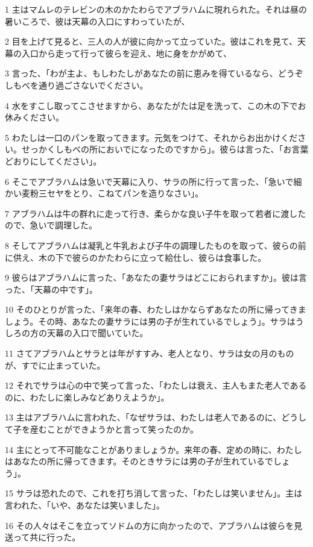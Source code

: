 \par 1 主はマムレのテレビンの木のかたわらでアブラハムに現れられた。それは昼の暑いころで、彼は天幕の入口にすわっていたが、
\par 2 目を上げて見ると、三人の人が彼に向かって立っていた。彼はこれを見て、天幕の入口から走って行って彼らを迎え、地に身をかがめて、
\par 3 言った、「わが主よ、もしわたしがあなたの前に恵みを得ているなら、どうぞしもべを通り過ごさないでください。
\par 4 水をすこし取ってこさせますから、あなたがたは足を洗って、この木の下でお休みください。
\par 5 わたしは一口のパンを取ってきます。元気をつけて、それからお出かけください。せっかくしもべの所においでになったのですから」。彼らは言った、「お言葉どおりにしてください」。
\par 6 そこでアブラハムは急いで天幕に入り、サラの所に行って言った、「急いで細かい麦粉三セヤをとり、こねてパンを造りなさい」。
\par 7 アブラハムは牛の群れに走って行き、柔らかな良い子牛を取って若者に渡したので、急いで調理した。
\par 8 そしてアブラハムは凝乳と牛乳および子牛の調理したものを取って、彼らの前に供え、木の下で彼らのかたわらに立って給仕し、彼らは食事した。
\par 9 彼らはアブラハムに言った、「あなたの妻サラはどこにおられますか」。彼は言った、「天幕の中です」。
\par 10 そのひとりが言った、「来年の春、わたしはかならずあなたの所に帰ってきましょう。その時、あなたの妻サラには男の子が生れているでしょう」。サラはうしろの方の天幕の入口で聞いていた。
\par 11 さてアブラハムとサラとは年がすすみ、老人となり、サラは女の月のものが、すでに止まっていた。
\par 12 それでサラは心の中で笑って言った、「わたしは衰え、主人もまた老人であるのに、わたしに楽しみなどありえようか」。
\par 13 主はアブラハムに言われた、「なぜサラは、わたしは老人であるのに、どうして子を産むことができようかと言って笑ったのか。
\par 14 主にとって不可能なことがありましょうか。来年の春、定めの時に、わたしはあなたの所に帰ってきます。そのときサラには男の子が生れているでしょう」。
\par 15 サラは恐れたので、これを打ち消して言った、「わたしは笑いません」。主は言われた、「いや、あなたは笑いました」。
\par 16 その人々はそこを立ってソドムの方に向かったので、アブラハムは彼らを見送って共に行った。
